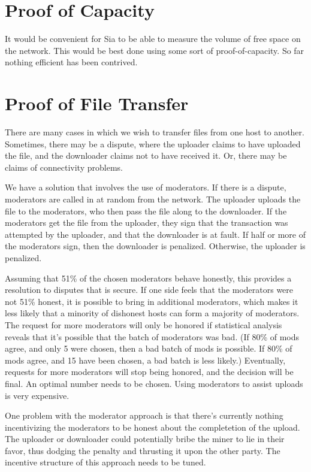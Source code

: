 \documentclass[twocolumn]{article}
\begin{document}
\section{Proof of Capacity}
It would be convenient for Sia to be able to measure the volume of free space on the network.
This would be best done using some sort of proof-of-capacity.
So far nothing efficient has been contrived.

\section{Proof of File Transfer}
There are many cases in which we wish to transfer files from one host to another.
Sometimes, there may be a dispute, where the uploader claims to have uploaded the file, and the downloader claims not to have received it.
Or, there may be claims of connectivity problems.

We have a solution that involves the use of moderators.
If there is a dispute, moderators are called in at random from the network.
The uploader uploads the file to the moderators, who then pass the file along to the downloader.
If the moderators get the file from the uploader, they sign that the transaction was attempted by the uploader, and that the downloader is at fault.
If half or more of the moderators sign, then the downloader is penalized.
Otherwise, the uploader is penalized.

Assuming that 51\% of the chosen moderators behave honestly, this provides a resolution to disputes that is secure.
If one side feels that the moderators were not 51\% honest, it is possible to bring in additional moderators, which makes it less likely that a minority of dishonest hosts can form a majority of moderators.
The request for more moderators will only be honored if statistical analysis reveals that it's possible that the batch of moderators was bad. (If 80\% of mods agree, and only 5 were chosen, then a bad batch of mods is possible. If 80\% of mods agree, and 15 have been chosen, a bad batch is less likely.)
Eventually, requests for more moderators will stop being honored, and the decision will be final.
An optimal number needs to be chosen.
Using moderators to assist uploads is very expensive.

One problem with the moderator approach is that there's currently nothing incentivizing the moderators to be honest about the completetion of the upload.
The uploader or downloader could potentially bribe the miner to lie in their favor, thus dodging the penalty and thrusting it upon the other party.
The incentive structure of this approach needs to be tuned.
\end{document}

